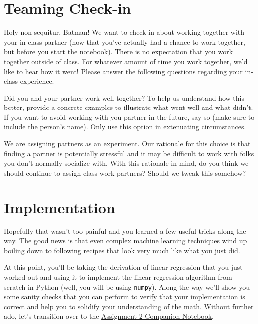 \documentclass[assignment02_Solutions]{subfiles}
\begin{document}
\section*{Teaming Check-in}

\begin{exercise}
Holy non-sequitur, Batman! We want to check in about working together with your in-class partner (now that you've actually had a chance to work together, but before you start the notebook). There is no expectation that you work together outside of class. For whatever amount of time you work together, we'd like to hear how it went!  Please answer the following questions regarding your in-class experience.

\bes
\item Did you and your partner work well together?  To help us understand how this better, provide a concrete examples to illustrate what went well and what didn't.  If you want to avoid working with you partner in the future, say so (make sure to include the person's name).  Only use this option in extenuating circumstances.
\item We are assigning partners as an experiment.  Our rationale for this choice is that finding a partner is potentially stressful and it may be difficult to work with folks you don't normally socialize with.  With this rationale in mind, do you think we should continue to assign class work partners?  Should we tweak this somehow?
\ees

\end{exercise}

\section{Implementation}

Hopefully that wasn't too painful and you learned a few useful tricks along the way.  The good news is that even complex machine learning techniques wind up boiling down to following recipes that look very much like what you just did.

At this point, you'll be taking the derivation of linear regression that you just worked out and using it to implement the linear regression algorithm from scratch in Python (well, you will be using {\tt numpy}).  Along the way we'll show you some sanity checks that you can perform to verify that your implementation is correct and help you to solidify your understanding of the math. Without further ado, let's transition over to the \href{https://colab.research.google.com/github/mlfa19/assignments/blob/master/Module\%201/02/Assignment_02_Companion.ipynb}{Assignment 2 Companion Notebook}.

\end{document}
